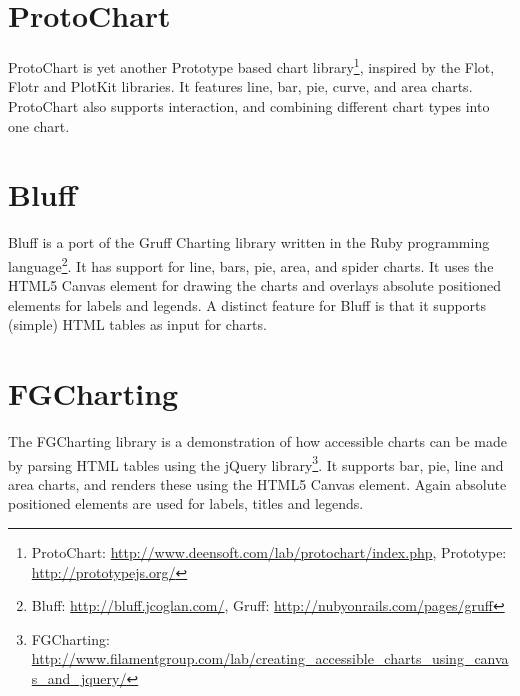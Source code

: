 \section{ProtoChart}
ProtoChart is yet another Prototype based chart library\footnote{ProtoChart: \url{http://www.deensoft.com/lab/protochart/index.php}, Prototype: \url{http://prototypejs.org/}}, inspired by the Flot, Flotr and PlotKit libraries. It features line, bar, pie, curve, and area charts. ProtoChart also supports interaction, and combining different chart types into one chart.

\section{Bluff}
Bluff is a port of the Gruff Charting library written in the Ruby programming language\footnote{Bluff: \url{http://bluff.jcoglan.com/}, Gruff: \url{http://nubyonrails.com/pages/gruff}}. It has support for line, bars, pie, area, and spider charts. It uses the HTML5 Canvas element for drawing the charts and overlays absolute positioned  elements for labels and legends. A distinct feature for Bluff is that it supports (simple) HTML tables as input for charts.

\section{FGCharting}
The FGCharting library is a demonstration of how accessible charts can be made by parsing HTML tables using the jQuery library\footnote{FGCharting: \url{http://www.filamentgroup.com/lab/creating\_accessible\_charts\_using\_canvas\_and\_jquery/}}. It supports bar, pie, line and area charts, and renders these using the HTML5 Canvas element. Again absolute positioned  elements are used for labels, titles and legends.
